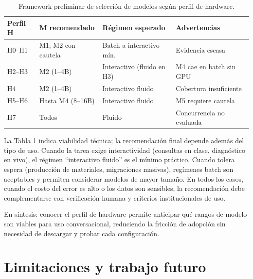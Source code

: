 \documentclass{llncs}
\begin{document}
\begin{table}[htbp]
\centering
\caption{Framework preliminar de selección de modelos según perfil de hardware.}
\begin{tabular}{|l|l|l|l|}
\hline
\textbf{Perfil H} & \textbf{M recomendado} & \textbf{Régimen esperado} & \textbf{Advertencias} \\
\hline
H0--H1 & M1; M2 con cautela & Batch a interactivo mín. & Evidencia escasa \\
\hline
H2--H3 & M2 (1--4B) & Interactivo (fluido en H3) & M4 cae en batch sin GPU \\
\hline
H4 & M2 (1--4B) & Interactivo fluido & Cobertura insuficiente \\
\hline
H5--H6 & Hasta M4 (8--16B) & Interactivo fluido & M5 requiere cautela \\
\hline
H7 & Todos & Fluido & Concurrencia no evaluada \\
\hline
\end{tabular}
\label{tab:framework}
\end{table}

La Tabla 1 indica viabilidad técnica; la recomendación final depende además del tipo de uso. Cuando la tarea exige interactividad (consultas en clase, diagnóstico en vivo), el régimen ``interactivo fluido'' es el mínimo práctico. Cuando tolera espera (producción de materiales, migraciones masivas), regímenes batch son aceptables y permiten considerar modelos de mayor tamaño. En todos los casos, cuando el costo del error es alto o los datos son sensibles, la recomendación debe complementarse con verificación humana y criterios institucionales de uso.

En síntesis: conocer el perfil de hardware permite anticipar qué rangos de modelo son viables para uso conversacional, reduciendo la fricción de adopción sin necesidad de descargar y probar cada configuración.

\section{Limitaciones y trabajo futuro}\label{limitaciones-y-trabajo-futuro}
\end{document}
